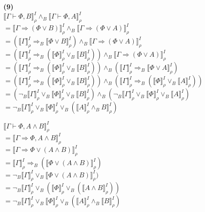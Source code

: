 \documentclass[11pt,letterpaper]{article}
\begin{document}
\vspace{10px}
\textbf{(9)}\\
 $\llbracket \Gamma \vdash \Phi, B  \rrbracket^{I}_{\rho} \land_{B} \llbracket\Gamma \vdash \Phi, A \rrbracket^{I}_{\rho}$\\
 $=\llbracket \Gamma \Rightarrow (\Phi \lor B ) \rrbracket^{I}_{\rho} \land_{B} \llbracket\Gamma \Rightarrow( \Phi\lor A) \rrbracket^{I}_{\rho}$\\
 $=(\llbracket \Gamma \rrbracket^{I}_{\rho} \Rightarrow_{B} \llbracket \Phi \lor B \rrbracket^{I}_{\rho}) \land_{B} \llbracket\Gamma \Rightarrow( \Phi\lor A) \rrbracket^{I}_{\rho}$\\
 $= (\llbracket \Gamma \rrbracket^{I}_{\rho} \Rightarrow_{B} (\llbracket \Phi \rrbracket^{I}_{\rho} \lor_{B} \llbracket B \rrbracket^{I}_{\rho})) \land_{B} \llbracket\Gamma \Rightarrow( \Phi\lor A) \rrbracket^{I}_{\rho}$\\
$= (\llbracket \Gamma \rrbracket^{I}_{\rho} \Rightarrow_{B} (\llbracket \Phi \rrbracket^{I}_{\rho} \lor_{B} \llbracket B \rrbracket^{I}_{\rho})) \land_{B} (\llbracket \Gamma \rrbracket^{I}_{\rho} \Rightarrow_{B} \llbracket \Phi\lor A \rrbracket^{I}_{\rho})$\\
$=(\llbracket \Gamma \rrbracket^{I}_{\rho} \Rightarrow_{B} (\llbracket \Phi \rrbracket^{I}_{\rho} \lor_{B} \llbracket B \rrbracket^{I}_{\rho})) \land_{B} (\llbracket \Gamma \rrbracket^{I}_{\rho} \Rightarrow_{B} (\llbracket \Phi\rrbracket^{I}_{\rho} \lor_{B} \llbracket A \rrbracket^{I}_{\rho}))$\\
$= (\neg_{B} \llbracket \Gamma \rrbracket^{I}_{\rho} \lor_{B} \llbracket \Phi \rrbracket^{I}_{\rho} \lor_{B} \llbracket B \rrbracket^{I}_{\rho}) \land_{B} (\neg_{B}\llbracket \Gamma \rrbracket^{I}_{\rho} \lor_{B} \llbracket \Phi \rrbracket^{I}_{\rho} \lor_{B} \llbracket A \rrbracket^{I}_{\rho})$\\
$= \neg_{B} \llbracket \Gamma \rrbracket^{I}_{\rho} \lor_{B} \llbracket \Phi \rrbracket^{I}_{\rho} \lor_{B} (\llbracket A \rrbracket^{I}_{\rho} \land_{B} B \rrbracket^{I}_{\rho})$\\
\vspace{10px}

$\llbracket \Gamma \vdash \Phi, A \land B \rrbracket^{I}_{\rho}$\\
$= \llbracket \Gamma \Rightarrow \Phi, A \land B \rrbracket^{I}_{\rho}$\\
$= \llbracket \Gamma \Rightarrow \Phi \lor (A \land B) \rrbracket^{I}_{\rho}$\\
$= \llbracket \Gamma \rrbracket^{I}_{\rho} \Rightarrow_{B} (\llbracket \Phi \lor (A \land B) \rrbracket^{I}_{\rho})$\\
$= \neg_{B} \llbracket \Gamma \rrbracket^{I}_{\rho} \lor_{B} \llbracket \Phi \lor (A \land B) \rrbracket^{I}_{\rho})$\\
$= \neg_{B} \llbracket \Gamma \rrbracket^{I}_{\rho} \lor_{B} (\llbracket \Phi \rrbracket^{I}_{\rho} \lor_{B} (\llbracket A \land B \rrbracket^{I}_{\rho}))$\\
$= \neg_{B} \llbracket \Gamma \rrbracket^{I}_{\rho} \lor_{B} \llbracket \Phi \rrbracket^{I}_{\rho} \lor_{B} (\llbracket A \rrbracket^{I}_{\rho} \land_{B} \llbracket B \rrbracket^{I}_{\rho})$\\
\end{document}
